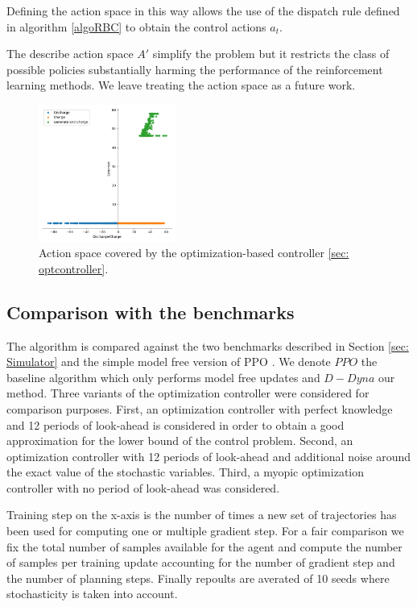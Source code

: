 \documentclass{article}
\begin{document}
		Defining the action space in this way allows the use of the dispatch rule defined in algorithm \ref{algoRBC} to obtain the control actions $a_t$.

	The describe action space $A'$ simplify the problem but it restricts the class of possible policies substantially harming the performance of the reinforcement learning methods. We leave treating the action space as a future work.

\begin{figure}[t]
	\includegraphics[width=0.4\textwidth]{action_space.png}
	\centering
	\caption{Action space covered by the optimization-based controller \ref{sec: optcontroller}.}
	\label{fig:action-space}
\end{figure}

\subsection{Comparison with the benchmarks}

The algorithm is compared against the two benchmarks described in Section \ref{sec: Simulator} and the simple model free version of PPO \cite{Schulman2017}. We denote $PPO$ the baseline algorithm which only performs model free updates and $D-Dyna$ our method.
Three variants of the optimization controller were considered for comparison purposes. First, an optimization controller with perfect knowledge and 12 periods of look-ahead is considered in order to obtain a good approximation for the lower bound of the control problem. Second, an optimization controller with 12 periods of look-ahead and additional noise around the exact value of the stochastic variables. Third, a myopic optimization controller with no period of look-ahead was considered.

Training step on the x-axis is the number of times a new set of trajectories has been used for computing one or multiple gradient step. For a fair comparison we fix the total number of samples available for the agent and compute the number of samples per training update accounting for the number of gradient step and the number of planning steps. Finally repoults are averated of 10 seeds where stochasticity is taken into account.
\end{document}
